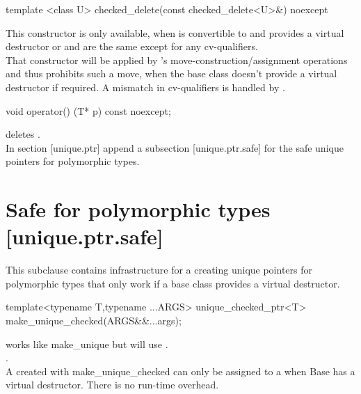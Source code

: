 \documentclass[ebook,11pt,article]{memoir}
\begin{document}
\begin{itemdecl}
template <class U>
checked_delete(const checked_delete<U>&) noexcept 
\end{itemdecl}
\pnum
\effects This constructor is only available, when  is convertible to  and  provides a virtual destructor or  and  are the same except for any cv-qualifiers.
\\
\pnum
\enternote
That constructor will be applied by 's move-construction/assignment operations and thus prohibits such a move, when the base class doesn't provide a virtual destructor if required. A mismatch in cv-qualifiers is handled by .
\exitnote

\begin{itemdecl}
     void operator() (T* p) const noexcept;
\end{itemdecl}
\pnum
\effects deletes .
\\

In section [unique.ptr] append a subsection [unique.ptr.safe] for the safe unique pointers for polymorphic types.
\\

\section{Safe  for polymorphic types [unique.ptr.safe]}
\pnum
This subclause contains infrastructure for a creating unique pointers for polymorphic types that only work if a base class provides a virtual destructor.\\

\begin{itemdecl}
template<typename T,typename ...ARGS>
unique_checked_ptr<T> make_unique_checked(ARGS&&...args);
\end{itemdecl}

\pnum
\effects works like make_unique but will use . 
\\

\pnum
\returns {}.
\\

\pnum
\enternote
A  created with make_unique_checked can only be assigned to a  when Base has a virtual destructor. There is no run-time overhead.
\exitnote
\end{document}
